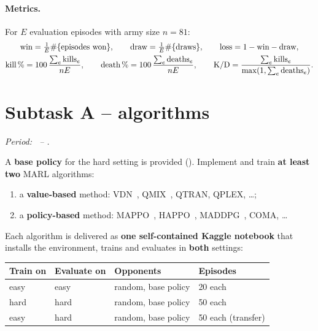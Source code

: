 \documentclass[11pt,a4paper]{article}
\begin{document}
\paragraph{Metrics.}
For $E$ evaluation episodes with army size $n=81$:
\begin{gather*}
  \text{win}=\tfrac{1}{E}\#\{\text{episodes won}\},\qquad
  \text{draw}=\tfrac{1}{E}\#\{\text{draws}\},\qquad
  \text{loss}=1-\text{win}-\text{draw},\\
  \text{kill\,\%}=100\,\frac{\sum_e \text{kills}_e}{nE},\qquad
  \text{death\,\%}=100\,\frac{\sum_e \text{deaths}_e}{nE},\qquad
  \text{K/D}=\frac{\sum_e \text{kills}_e}{\max(1,\sum_e \text{deaths}_e)} .
\end{gather*}

\section{Subtask A -- algorithms}
\emph{Period: \DateStart\ -- \DateAEnd.}\par\smallskip

A \textbf{base policy} for the hard setting is provided (\DateBaseA).  Implement and train
\textbf{at least two} MARL algorithms:
\begin{enumerate}
  \item a \textbf{value-based} method: VDN~\cite{vdn}, QMIX~\cite{qmix}, QTRAN, QPLEX, \dots;
  \item a \textbf{policy-based} method: MAPPO~\cite{mappo}, HAPPO~\cite{happo},
        MADDPG~\cite{maddpg}, COMA, \dots
\end{enumerate}
Each algorithm is delivered as \textbf{one self-contained Kaggle notebook} that installs the
environment, trains and evaluates in \textbf{both} settings:

\begin{table}[H]
\centering
\begin{tabular}{@{}llll@{}}
\toprule
Train on & Evaluate on & Opponents & Episodes \\
\midrule
easy & easy & random, base policy & 20 each \\
hard & hard & random, base policy & 50 each \\
easy & hard & random, base policy & 50 each (transfer) \\
\bottomrule
\end{tabular}
\end{table}
\end{document}
